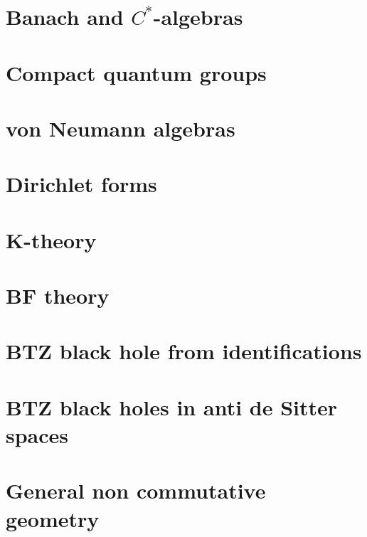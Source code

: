 \documentclass[a4paper,twoside,11pt]{book}
\begin{document}
\chapter{Banach and \texorpdfstring{$C^*$}{C*}-algebras}




\chapter{Compact quantum groups}


\chapter{von Neumann algebras}





\chapter{Dirichlet forms}


\chapter{K-theory}


\chapter{BF theory}


\chapter{BTZ black hole from identifications}




\chapter{BTZ black holes in anti de Sitter spaces}                  \label{ChapBHinAdS}









\chapter{General non commutative geometry}


\end{document}
